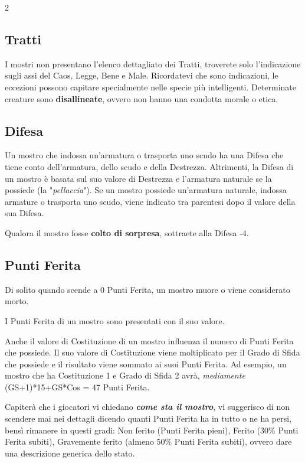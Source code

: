 \begin{multicols}{2}
\subsection{Tratti}

I mostri non presentano l'elenco dettagliato dei Tratti, troverete solo l'indicazione sugli assi del Caos, Legge, Bene e Male. Ricordatevi che sono indicazioni, le eccezioni possono capitare specialmente nelle specie più intelligenti.
Determinate creature sono \textbf{disallineate}, ovvero non hanno una condotta morale o etica.

\subsection{Difesa}

Un mostro che indossa un'armatura o trasporta uno scudo ha una Difesa che tiene conto dell'armatura, dello scudo e della Destrezza. Altrimenti, la Difesa di un mostro è basata sul suo valore di Destrezza e l'armatura naturale se la possiede (la "\emph{pellaccia}"). Se un mostro possiede un'armatura naturale, indossa armature o trasporta uno scudo, viene indicato tra parentesi dopo il valore della sua Difesa.

Qualora il mostro fosse \textbf{colto di sorpresa}, sottraete alla Difesa -4.

\subsection{Punti Ferita}

Di solito quando scende a 0 Punti Ferita, un mostro muore o viene considerato morto.

I Punti Ferita di un mostro sono presentati con il suo valore.

Anche il valore di Costituzione di un mostro influenza il numero di Punti Ferita che possiede. Il suo valore di Costituzione viene moltiplicato per il Grado di Sfida che possiede e il risultato viene sommato ai suoi Punti Ferita. Ad esempio, un mostro che ha Costituzione 1 e Grado di Sfida 2 avrà, \emph{mediamente} (GS+1)*15+GS*Cos = 47 Punti Ferita.

Capiterà che i giocatori vi chiedano \textbf{\emph{come sta il mostro}}, vi suggerisco di non scendere mai nei dettagli dicendo quanti Punti Ferita ha in tutto o ne ha persi, bensì rimanere in questi gradi: Non ferito (Punti Ferita pieni), Ferito (30\% Punti Ferita subiti), Gravemente ferito (almeno 50\% Punti Ferita subiti), ovvero dare una descrizione generica dello stato. 


\end{multicols}
